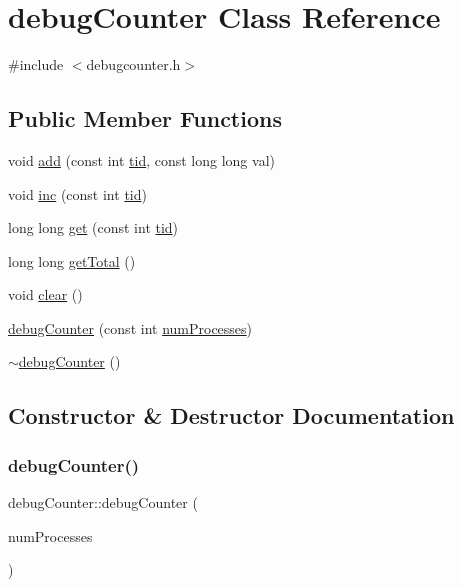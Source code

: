 \hypertarget{classdebugCounter}{}\section{debug\+Counter Class Reference}
\label{classdebugCounter}


{\ttfamily \#include $<$debugcounter.\+h$>$}

\subsection*{Public Member Functions}
\begin{DoxyCompactItemize}
\item 
void \hyperlink{classdebugCounter_a27a5b024a98aa03068ebca776256d2b9}{add} (const int \hyperlink{microbench_2main_8cpp_a9ca9869868fe7e7a38a921cc7de4103f}{tid}, const long long val)
\item 
void \hyperlink{classdebugCounter_a1689449989f1da7622d97dec001bffae}{inc} (const int \hyperlink{microbench_2main_8cpp_a9ca9869868fe7e7a38a921cc7de4103f}{tid})
\item 
long long \hyperlink{classdebugCounter_a4308308b267bcd03046ddb0db0d64a60}{get} (const int \hyperlink{microbench_2main_8cpp_a9ca9869868fe7e7a38a921cc7de4103f}{tid})
\item 
long long \hyperlink{classdebugCounter_a2086ed1038e4c467affe711a7dbf6ac1}{get\+Total} ()
\item 
void \hyperlink{classdebugCounter_a9c6bfef91b842103ddac1c6a22247209}{clear} ()
\item 
\hyperlink{classdebugCounter_a440bdb1153301de6874e01c3f9dc1330}{debug\+Counter} (const int \hyperlink{testing_8cpp_aa085812188e21ede75351d88b9b2c30d}{num\+Processes})
\item 
\hyperlink{classdebugCounter_aa2eea12ef30fa671d4ee30d32caac190}{$\sim$debug\+Counter} ()
\end{DoxyCompactItemize}


\subsection{Constructor \& Destructor Documentation}
\mbox{\label{classdebugCounter_a440bdb1153301de6874e01c3f9dc1330}} 
\subsubsection{\texorpdfstring{debug\+Counter()}{debugCounter()}}
{\footnotesize\ttfamily debug\+Counter\+::debug\+Counter (\begin{DoxyParamCaption}\item[{const int}]{num\+Processes }\end{DoxyParamCaption})\hspace{0.3cm}{\ttfamily [inline]}}

